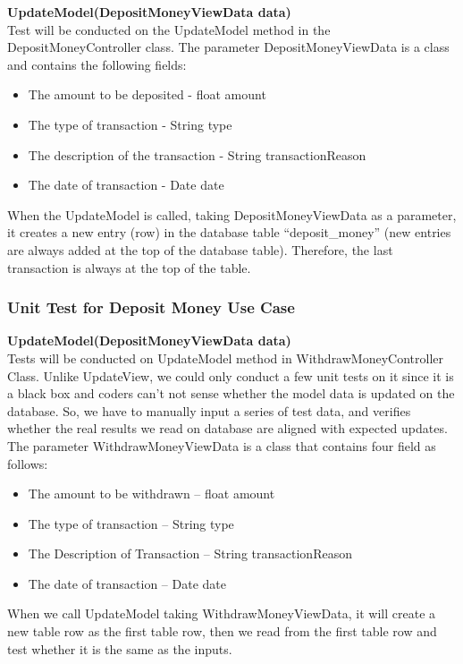 \documentclass[12pt]{article}
\begin{document}
{\bf UpdateModel(DepositMoneyViewData data)}\\
Test will be conducted on the UpdateModel method in the DepositMoneyController class. The parameter DepositMoneyViewData is a class and contains the following fields:
\begin{itemize}
  \item The amount to be deposited - float amount
  \item The type of transaction - String type
  \item The description of the transaction - String transactionReason
  \item The date of transaction - Date date
\end{itemize}
When the UpdateModel is called, taking DepositMoneyViewData as a parameter, it creates a new entry (row) in the database table “deposit\_money” (new entries are always added at the top of the database table). Therefore, the last transaction is always at the top of the table.

\subsubsection{Unit Test for Deposit Money Use Case}

{\bf UpdateModel(DepositMoneyViewData data)}\\
Tests will be conducted on UpdateModel method in WithdrawMoneyController Class. Unlike UpdateView, we could only conduct a few unit tests on it since it is a black box and coders can’t not sense whether the model data is updated on the database. So, we have to manually input a series of test data, and verifies whether the real results we read on database are aligned with expected updates. The parameter WithdrawMoneyViewData is a class that contains four field as follows:
\begin{itemize}
  \item The amount to be withdrawn – float amount
  \item The type of transaction – String type
  \item The Description of Transaction – String transactionReason
  \item The date of transaction – Date date
\end{itemize}
When we call UpdateModel taking WithdrawMoneyViewData, it will create a new table row as the first table row, then we read from the first table row and test whether it is the same as the inputs.
\end{document}
